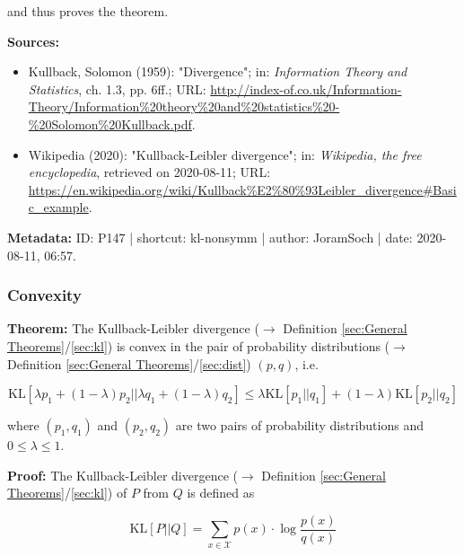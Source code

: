 \documentclass[a4paper,12pt,twoside]{book}
\begin{document}
and thus proves the theorem.


\vspace{1em}
\textbf{Sources:}
\begin{itemize}
\item Kullback, Solomon (1959): "Divergence"; in: \textit{Information Theory and Statistics}, ch. 1.3, pp. 6ff.; URL: \url{http://index-of.co.uk/Information-Theory/Information%20theory%20and%20statistics%20-%20Solomon%20Kullback.pdf}.
\item Wikipedia (2020): "Kullback-Leibler divergence"; in: \textit{Wikipedia, the free encyclopedia}, retrieved on 2020-08-11; URL: \url{https://en.wikipedia.org/wiki/Kullback%E2%80%93Leibler_divergence#Basic_example}.
\end{itemize}


\vspace{1em}
\textbf{Metadata:} ID: P147 | shortcut: kl-nonsymm | author: JoramSoch | date: 2020-08-11, 06:57.
\vspace{1em}



\subsubsection[\textbf{Convexity}]{Convexity} \label{sec:kl-conv}
\setcounter{equation}{0}

\textbf{Theorem:}  The Kullback-Leibler divergence ($\rightarrow$ Definition \ref{sec:General Theorems}/\ref{sec:kl}) is convex in the pair of probability distributions ($\rightarrow$ Definition \ref{sec:General Theorems}/\ref{sec:dist}) $(p,q)$, i.e.

\begin{equation} \label{eq:kl-conv-KL-conv}
\mathrm{KL}[\lambda p_1 + (1-\lambda) p_2||\lambda q_1 + (1-\lambda) q_2] \leq \lambda \mathrm{KL}[p_1||q_1] + (1-\lambda) \mathrm{KL}[p_2||q_2]
\end{equation}

where $(p_1,q_1)$ and $(p_2,q_2)$ are two pairs of probability distributions and $0 \leq \lambda \leq 1$.


\vspace{1em}
\textbf{Proof:} The Kullback-Leibler divergence ($\rightarrow$ Definition \ref{sec:General Theorems}/\ref{sec:kl}) of $P$ from $Q$ is defined as

\begin{equation} \label{eq:kl-conv-KL}
\mathrm{KL}[P||Q] = \sum_{x \in \mathcal{X}} p(x) \cdot \log \frac{p(x)}{q(x)}
\end{equation}
\end{document}
